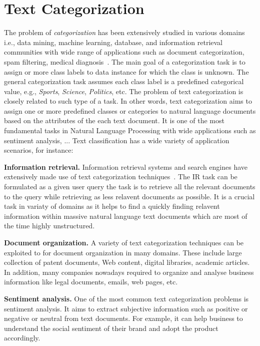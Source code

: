 \chapter{Text Categorization}
\label{cha:foundations_text_cat}
The problem of \textit{categorization} has been extensively studied in various domains i.e., data mining, machine learning, database, and information retrieval communities with wide range of applications such as document categorization, spam filtering, medical diagnosis~\cite{book_survey_text_class_algorithms}. The main goal of a categorization task is to assign or more class labels to data instance for which the class is unknown. The general categorization task assumes each class label is a predefined categorical value, e.g., \textit{Sports}, \textit{Science}, \textit{Politics}, etc. The problem of text categorization is closely related to such type of a task. In other words, text categorization aims to assign one or more predefined classes or categories to natural language documents based on the attributes of the each text document. It is one of the most fundamental tasks in Natural Language Processing with wide applications such as sentiment analysis, ... %
Text classification
has a wide variety of application scenarios, for instance: \newline%

\textbf{Information retrieval.}
Information retrieval systems and search engines have extensively made use of text categorization techniques~\cite{survey}. The IR task can be formulated as a given user query the task is to retrieve all the relevant documents to the query while retrieving as less relavent documents as possible. It is a crucial task in variaty of domains as it helps to find a quickly finding relavent information within massive natural language text documents which are most of the time highly unstructured. 


\textbf{Document organization.}
A variety of text categorization techniques can be exploited to for document organization in many domains. These include large collection of patent documents, Web content, digital libraries, academic articles. In addition, many companies nowadays required to organize and analyse business information like legal documents, emails, web pages, etc. 

\textbf{Sentiment analysis.}
One of the most common text categorization problems is sentiment analysis. It aims to extract subjective information such as positive or negative or neutral from text documents. For example, it can help business to understand the social sentiment of their brand and adopt the product accordingly.  

